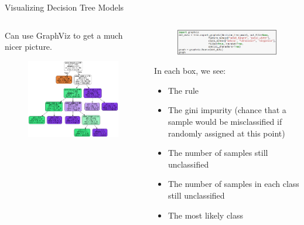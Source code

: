 \documentclass[aspectratio=169]{../latex_main/tntbeamer}  %
\begin{document}
	
	\begin{frame}{Visualizing Decision Tree Models }
	    \begin{columns}
	        \begin{column}{.4\textwidth}
	        Can use GraphViz to get a much nicer picture.
	                \begin{figure}
	                    \includegraphics[scale=.5]{Bild23}
	                \end{figure}
	        \end{column}
	        
	        
	        \begin{column}{.6\textwidth}
	                \begin{figure}
	                    \includegraphics[scale=.55]{Bild24}
	                \end{figure}
	                In each box, we see:
	                \begin{itemize}
	                    \item The rule
	                    \item The gini impurity (chance that a sample would be misclassified if randomly assigned at this point)
	                    \item The number of samples still unclassified
	                    \item The number of samples in each class still unclassified
	                    \item The most likely class
	                \end{itemize}
	        \end{column}
	    \end{columns}
	\end{frame}
	
\end{document}
